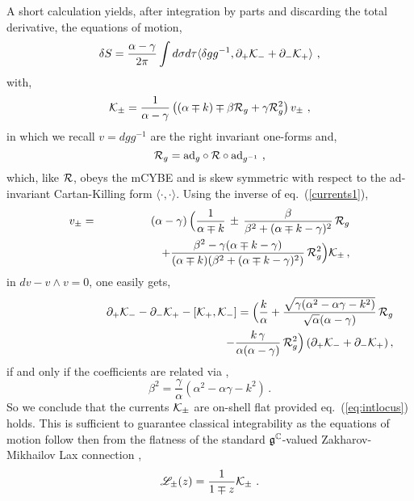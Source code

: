 \documentclass[12pt]{article}
\def\Lax{{\mathscr L}}
\def\ee{\boldsymbol{e}}
\def\be{\begin{equation}}
\def\ee{\end{equation}}
\begin{document}
 A short calculation yields, after integration by parts and discarding the total derivative,  the equations of motion,
        \be
  \delta S = \frac{ \alpha- \gamma}{2\pi}\int d \sigma d\tau    \langle   \delta g g^{-1} , \partial_+{\cal K}_- + \partial_-{\cal K}_+  \rangle  \ ,
   \ee
  with, 
  \be
  {\cal K}_\pm = \frac{1}{\alpha - \gamma}  \left( (\alpha \mp  k)  \mp \beta {\cal R}_g + \gamma {\cal R}_g^2  \right) v_\pm  \ , \label{currents1}
  \ee
    in which we recall $v= dg g^{-1}$ are the right invariant one-forms and, 
    \be
     {\cal R}_g= \textrm{ad}_g \circ   {\cal R}  \circ \textrm{ad}_{g^{-1}}  \ , 
    \ee
    which, like ${\cal R}$, obeys the mCYBE and is skew symmetric with respect to the ad-invariant Cartan-Killing form $\langle \cdot , \cdot  \rangle$.   
    Using the inverse of eq.~(\ref{currents1}),
 \begin{eqnarray}
v_\pm&=&\left(\alpha-\gamma\right)\Big( \frac{1}{\alpha \mp k}\, \pm \,\frac{ \beta }{\beta^2+( \alpha \mp k- \gamma )^2}\,{\cal R}_g\nonumber\\
&& \qquad \qquad \quad +\frac{ \beta ^2- \gamma ( \alpha \mp k- \gamma )}{(\alpha \mp k)(\beta^2+( \alpha \mp k- \gamma )^2)} \,
{\cal R}_g^2\Big){\cal K}_\pm\,,
\end{eqnarray}    
in $dv-v\wedge v=0$, one easily gets,
\begin{eqnarray}
&&\partial _+{\cal K}_-- \partial _-{\cal K}_+- [{\cal K}_+,{\cal K}_-]= 
\Big(
 \frac k \alpha + \frac{\sqrt{ \gamma (\alpha ^2- \alpha \gamma -k^2)}}{\sqrt{\alpha }( \alpha-\gamma )}\,{\cal R}_g   \nonumber\\
 &&\hspace{5.9cm} -\frac{k \,\gamma }{\alpha (\alpha  -\gamma )}\,{\cal R}_g^2
\Big)\,( \partial_+{\cal K}_-+ \partial _-{\cal K}_+)\,, \label{osflat2}
\end{eqnarray} 
if and only if the coefficients are related via \cite{Delduc:2014uaa}, 
   \be
   \label{eq:intlocus}
   \beta^2 = \frac{\gamma}{\alpha} \left( \alpha^2 - \alpha \gamma - k^2 \right) \, .
   \ee 
So we conclude that the currents $ {\cal K}_\pm$ are on-shell flat  provided  eq.~(\ref{eq:intlocus}) holds. This is sufficient to guarantee classical integrability as the equations of motion follow then from the flatness of the standard $\frak{g}^{\mathbb{C}}$-valued Zakharov-Mikhailov Lax connection \cite{Zakharov:1973pp},
    \be\label{eq:lax}
\Lax_\pm(z) = \frac{1}{1 \mp z} {\cal K}_\pm  \ . 
   \ee
\end{document}
